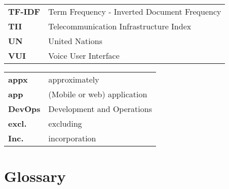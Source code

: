 \begin{flushleft}
\begin{tabular}{ll}
\textbf{TF-IDF}	&	Term Frequency - Inverted Document Frequency\\
\textbf{TII}	&	Telecommunication Infrastructure Index\\

\textbf{UN}		&	United Nations\\

\textbf{VUI}	&	Voice User Interface\\




\end{tabular}
\end{flushleft}


\begin{flushleft}
	\begin{tabular}{ll}
		
\textbf{appx}	&	approximately\\
\textbf{app}	&	(Mobile or web) application\\
\textbf{DevOps}	&	Development and Operations\\
\textbf{excl.}	& 	excluding\\
\textbf{Inc.}	&	incorporation\\
\end{tabular}
\end{flushleft}


\newpage
\section*{Glossary}
%

